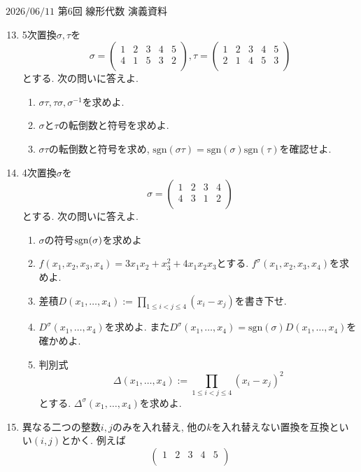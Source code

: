 \documentclass[dvipdfmx,a4paper,11pt]{article} %
\newcommand{\sgn}{{\rm sgn}}
\theoremstyle{definition}
\begin{document}
 \newpage
 $\boxed{\text{2026/06/11 第6回 線形代数 演義資料}}$
  \begin{enumerate}[label=\textbf{問題}\arabic*.]
 \setcounter{enumi}{12}
 \item 5次置換$ \sigma, \tau$を
 $$
 \sigma
 =
\begin{pmatrix}
1& 2& 3 & 4  & 5 \\
4& 1& 5& 3& 2 \\
\end{pmatrix}
, 
\tau 
 =
\begin{pmatrix}
1& 2& 3 & 4  & 5 \\
2& 1& 4& 5& 3 \\
\end{pmatrix}
$$
とする. 
次の問いに答えよ.
\begin{enumerate}
\item $\sigma \tau, \tau \sigma, \sigma^{-1}$を求めよ.
\item $\sigma$と$\tau$の転倒数と符号を求めよ. 
\item $\sigma \tau$の転倒数と符号を求め, $\mathrm{sgn}(\sigma \tau)=\mathrm{sgn}(\sigma) \mathrm{sgn}(\tau)$を確認せよ. 
\end{enumerate}
 \item 4次置換$\sigma$を
 $$
 \sigma
 =
\begin{pmatrix}
1& 2& 3 & 4  \\
4& 3& 1& 2\\
\end{pmatrix}
$$
とする. 
次の問いに答えよ.
\begin{enumerate}
\item $\sigma$の符号$\mathrm{\sgn}(\sigma)$を求めよ
\item $f(x_1, x_2, x_3, x_4)=3x_1x_2 + x_{3}^{2}+ 4x_1x_2x_3$とする. 
$f^{\sigma}(x_1, x_2, x_3, x_4)$を求めよ. 
\item 差積$D(x_1, \ldots, x_4):=\prod_{1 \le i < j \le 4} (x_i - x_j)$を書き下せ. 
\item $D^{\sigma}(x_1, \ldots, x_4)$を求めよ. また$D^{\sigma}(x_1, \ldots, x_4)
=\mathrm{sgn}(\sigma)D(x_1, \ldots, x_4)$を確かめよ. 
\item 判別式
$$
\Delta (x_1, \ldots, x_4):=\prod_{1 \le i < j \le 4} (x_i - x_j)^2
$$
とする. $\Delta^{\sigma}(x_1, \ldots, x_4)$を求めよ. 
\end{enumerate}
\item 異なる二つの整数$i,j$のみを入れ替え, 他の$k$を入れ替えない置換を互換といい$(i,j)$とかく. 
例えば
$$
\begin{pmatrix}
1& 2& 3 & 4  & 5 \\

\end{pmatrix}$$
\end{enumerate}
\end{document}
